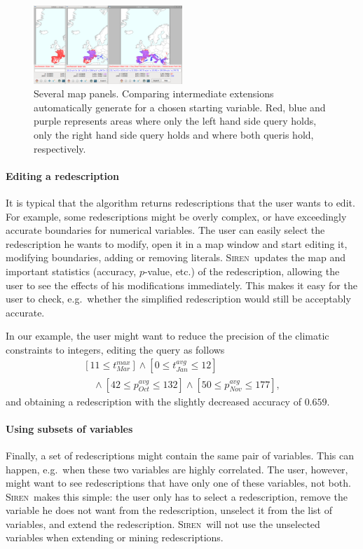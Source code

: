 \documentclass{sig-alternate}
\newcommand{\prg}[1]{\paragraph{#1}}
\newcommand{\Siren}{\textsc{Siren}}
\begin{document}
\begin{figure}
  \centering
\includegraphics[width=0.5\textwidth]{screenshots/comparison.png}
  \caption{Several map panels. Comparing intermediate extensions automatically generate for a chosen starting variable. Red, blue and purple represents areas where only the left hand side query holds, only the right hand side query holds and where both queris hold, respectively.}
  \label{fig:comparison}
\end{figure}

\prg{Editing a redescription} 
It is typical that the algorithm returns redescriptions that the user
wants to edit. For example, some redescriptions might be overly
complex, or have exceedingly accurate boundaries for numerical
variables. The user can easily select the redescription he wants to
modify, open it in a map window and start editing it, modifying
boundaries, adding or removing literals. \Siren\ updates the map and
important statistics (accuracy, $p$-value, etc.) of the redescription,
allowing the user to see the effects of his modifications immediately. This makes it
easy for the user to check, e.g.\ whether the simplified redescription
would still be acceptably accurate.

In our example, the user might want to reduce the precision of the climatic constraints  to integers, editing the query as follows
\begin{equation*}
\begin{array}{l}
[11 \leq t_{Mar}^{max}] \land  [0 \leq t_{Jan}^{avg} \leq 12]\\[1mm]
\quad\land  [42 \leq p_{Oct}^{avg} \leq 132] \land [50 \leq p_{Nov}^{avg} \leq 177],
\end{array}
\end{equation*}
and obtaining a redescription with the slightly decreased accuracy of $0.659$.

\prg{Using subsets of variables}
Finally, a set of redescriptions might contain the same pair of
variables. This can happen, e.g.\ when these two variables are highly
correlated. The user, however, might want to see redescriptions that have
only one of these variables, not both. \Siren\ makes this simple: the user
only has to select a redescription, remove the variable he does not
want from the redescription, unselect it from the list of variables, and
extend the redescription. \Siren\ will not use the unselected
variables when extending or mining redescriptions.
\end{document}
